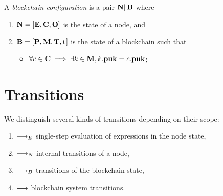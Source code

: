 \documentclass[a4paper]{llncs}
\begin{document}
\begin{definition}%
A \emph{blockchain configuration} is a pair
$ \textbf{N} \| \textbf{B}$ where
\begin{enumerate}
\item $\textbf{N} = [\textbf{E}, \textbf{C}, \textbf{O}]$ is the state of a node, and
\item $\textbf{B} = [\textbf{P}, \textbf{M}, \textbf{T},
  \textbf{t}]$ is the state of a blockchain  
  such that
  \begin{itemize}
  \item
    $\forall c \in \textbf{C} \implies \exists k\in \textbf{M}, k.\textbf{puk} =
    c.\textbf{puk}$;
  \end{itemize}
\end{enumerate}
\end{definition}

\section{Transitions}
\label{sec:transitions}

We distinguish several kinds of transitions depending on their scope:
\begin{enumerate}
\item $\stackrel{{}}\longrightarrow_E$ single-step evaluation of expressions in the node state,
\item $\stackrel{{}}\longrightarrow_N$ internal transitions of a node,
\item $\stackrel{{}}\longrightarrow_B$ transitions of the blockchain state,
\item $\longrightarrow$ blockchain system transitions.
\end{enumerate}
\end{document}
